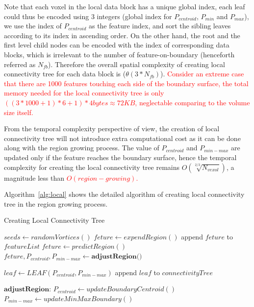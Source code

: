 \documentclass[10pt, conference, compsocconf]{IEEEtran}
\begin{document}
Note that each voxel in the local data block has a unique global index, each leaf could thus be encoded using 3 integers (global index for $P_{centroid}$, $P_{min}$ and $P_{max}$), we use the index of $P_{centroid}$ as the feature index, and sort the sibling leaves according to its index in ascending order. On the other hand, the root and the first level child nodes can be encoded with the index of corresponding data blocks, which is irrelevant to the number of feature-on-boundary (henceforth referred as $N_{fb}$). Therefore the overall spatial complexity of creating local connectivity tree for each data block is ($\theta(3*N_{fb})$). \textcolor{red}{Consider an extreme case that there are 1000 features touching each side of the boundary surface, the total memory needed for the local connectivity tree is only $((3*1000 + 1)*6 + 1) * 4 bytes \approx 72KB$, neglectable comparing to the volume size itself.}

From the temporal complexity perspective of view, the creation of local connectivity tree will not introduce extra computational cost as it can be done along with the region growing process. The value of $P_{centroid}$ and $P_{min-max}$ are updated only if the feature reaches the boundary surface, hence the temporal complexity for creating the local connectivity tree remains ${O(\sqrt[2/3]{N_{vexol}})}$, a magnitude less than \textcolor{red}{$O(region-growing)$.}

Algorithm~\ref{alg:local} shows the detailed algorithm of creating local connectivity tree in the region growing process.
\begin{algorithm}
\caption{Creating Local Connectivity Tree}
\label{alg:local}
\begin{algorithmic}

	\STATE $seeds \leftarrow randomVortices()$
		\STATE $feture \leftarrow expendRegion()$
		\STATE append $feture$ to $featureList$
	\ENDFOR	
\ELSE
		\STATE $feture \leftarrow predictRegion()$
		\STATE $feture,P_{centroid},P_{min-max} \leftarrow \textbf{adjustRegion()}$
		
		\STATE $leaf \leftarrow LEAF(P_{centroid}, P_{min-max})$
		\STATE append $leaf$ to $connectivityTree$
	\ENDFOR
\ENDIF
\end{algorithmic}

\begin{algorithmic} \STATE \end{algorithmic}	%

\begin{algorithmic}
\STATE $\textbf{adjustRegion:}$
		\STATE $P_{centroid} \leftarrow updateBoundaryCentroid()$
		\STATE $P_{min-max} \leftarrow updateMinMaxBoundary()$
	\ENDIF
\end{algorithmic}
\end{algorithm}
\end{document}
